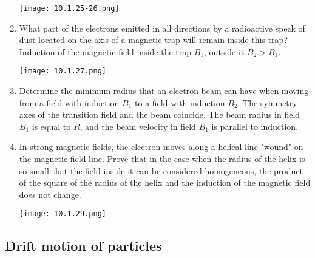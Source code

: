 \documentclass{article}
\begin{document}
\begin{enumerate}[label=10.1.\arabic*]
\begin{center}
    \texttt{[image: 10.1.25-26.png]}
\end{center}

\item What part of the electrons emitted in all directions by a radioactive speck of dust located on the axis of a magnetic trap will remain inside this trap? Induction of the magnetic field inside the trap $B_1$, outside it $B_2 > B_1$.

\begin{center}
    \texttt{[image: 10.1.27.png]}
\end{center}

\item Determine the minimum radius that an electron beam can have when moving from a field with induction $B_1$ to a field with induction $B_2$. The symmetry axes of the transition field and the beam coincide. The beam radius in field $B_1$ is equal to $R$, and the beam velocity in field $B_1$ is parallel to induction.

\item In strong magnetic fields, the electron moves along a helical line "wound" on the magnetic field line. Prove that in the case when the radius of the helix is so small that the field inside it can be considered homogeneous, the product of the square of the radius of the helix and the induction of the magnetic field does not change.

\begin{center}
    \texttt{[image: 10.1.29.png]}
\end{center}



\end{enumerate}
\subsection{Drift motion of particles}
\end{document}
